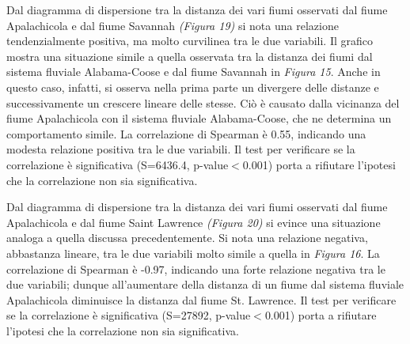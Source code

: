\documentclass{article} %
\begin{document}
Dal diagramma di dispersione tra la distanza dei vari fiumi osservati dal fiume Apalachicola e dal fiume Savannah \textit{(Figura 19)} si nota una relazione tendenzialmente positiva, ma molto curvilinea tra le due variabili. 
Il grafico mostra una situazione simile a quella osservata tra la distanza dei fiumi dal sistema fluviale Alabama-Coose e dal fiume Savannah in \textit{Figura 15}. Anche in questo caso, infatti, si osserva nella prima parte un divergere delle distanze e successivamente un crescere lineare delle stesse. 
Ciò è causato dalla vicinanza del fiume Apalachicola con il sistema fluviale Alabama-Coose, che ne determina un comportamento simile.
La correlazione di Spearman è 0.55, indicando una modesta relazione positiva tra le due variabili.  
Il test per verificare se la correlazione è significativa (S=6436.4, p-value$<$0.001) porta a rifiutare l'ipotesi che la correlazione non sia significativa.

Dal diagramma di dispersione tra la distanza dei vari fiumi osservati dal fiume Apalachicola e dal fiume Saint Lawrence \textit{(Figura 20)} si evince una situazione analoga a quella discussa precedentemente.
Si nota una relazione negativa, abbastanza lineare, tra le due variabili molto simile a quella in \textit{Figura 16}.
La correlazione di Spearman è -0.97, indicando una forte relazione negativa tra le due variabili; dunque all'aumentare della distanza di un fiume dal sistema fluviale Apalachicola diminuisce la distanza dal fiume St. Lawrence. 
Il test per verificare se la correlazione è significativa (S=27892, p-value$<$0.001) porta a rifiutare l'ipotesi che la correlazione non sia significativa.
\end{document}
